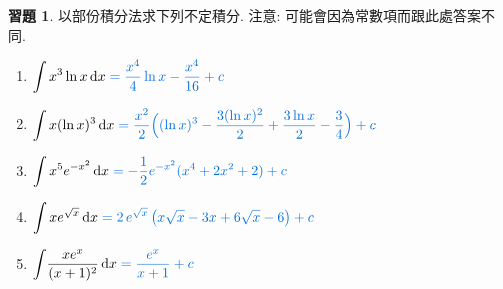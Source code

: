 \documentclass[12pt,a4paper]{extarticle}
\newcommand{\ds}{\displaystyle}
\theoremstyle{definition}
\newtheorem*{exe}{習題}
\begin{document}
\begin{exe} 以部份積分法求下列不定積分. 注意: 可能會因為常數項而跟此處答案不同. 
  \begin{enumerate}\setlength{\itemsep}{0pt}
    \item $\ds\int x^3\ln x\,\mathrm{d}x {\color{C2}\;= \frac{x^4}{4}\ln x -\frac{x^4}{16} + c}$
    \item $\ds\int x(\ln x)^3\,\mathrm{d}x {\color{C2}\;= \frac{x^2}{2}\Big((\ln x)^3 -\frac{3(\ln x)^2}{2} + \frac{3\ln x}{2} - \frac{3}{4} \Big) + c}$
    \item $\ds\int x^5 e^{-x^2}\,\mathrm{d}x {\color{C2}\;= -\frac{1}{2}e^{-x^2}(x^4 + 2x^2 + 2) + c}$
    \item $\ds\int x e^{\sqrt{x}}\,\mathrm{d}x {\color{C2}\;= 2\,e^{\sqrt{x}}\,\big(x\sqrt{x} - 3x + 6\sqrt{x} - 6\big) + c}$
    \item $\ds\int\!\frac{x e^x}{(x + 1)^2}\,\mathrm{d}x {\color{C2}\;= \frac{e^x}{x + 1} + c}  $
  \end{enumerate}
\end{exe}
\end{document}
